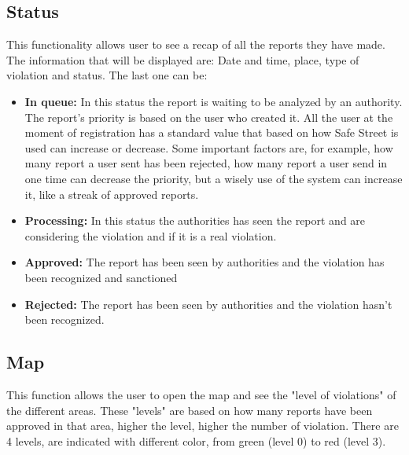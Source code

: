 \documentclass[12pt,a4paper]{report}
\begin{document}
		\subsection{Status}
			This functionality allows user to see a recap of all the reports they have made. The information that will be displayed
			are: Date and time, place, type of violation and status. The last one can be:
			\begin{itemize}
				\item \textbf{In queue:}
					In this status the report is waiting to be analyzed by an authority. The report's priority is based on
					the user who created it. All the user at the moment of registration has a standard value that based on
					how Safe Street is used can increase or decrease. Some important factors are, for example, 
					how many report a user sent has been rejected, how many report a user send in one time can decrease
					the priority, but a wisely use of the system can increase it, like a streak of approved reports.
				\item \textbf{Processing:}
					In this status the authorities has seen the report and are considering the violation and if it is a real
					violation.
				\item \textbf{Approved:}
					The report has been seen by authorities and the violation has been recognized and sanctioned 
				\item \textbf{Rejected:}
					The report has been seen by authorities and the violation hasn't been recognized.
			\end{itemize}
		\subsection{Map}
			This function allows the user to open the map and see the "level of violations" of the different areas. These "levels" are
			based on how many reports have been approved in that area, higher the level, higher the number of violation.
			There are 4 levels, are indicated with different color, from green (level 0) to red (level 3).
			
\end{document}
